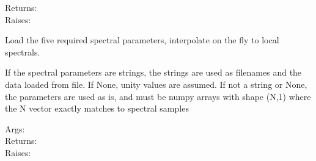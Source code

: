 \documentclass[a4paper,10pt,english]{sphinxmanual}
\begin{document}
\begin{fulllineitems}
\begin{fulllineitems}
\begin{description}
\item[{Returns:}] \leavevmode
{}

\item[{Raises:}] \leavevmode
{}

\end{description}

\end{fulllineitems}


\begin{fulllineitems}
\label{rylookup:pyradi.rylookup.RadLookup.LoadSpectrals}
Load the five required spectral parameters, interpolate on the 
fly to local spectrals.

If the spectral parameters are strings, the strings are used as filenames 
and the data loaded from file.  If None, unity values are assumed. If not 
a string or None, the parameters are used as is, and must be numpy arrays
with shape (N,1) where the N vector exactly matches to spectral samples
\begin{description}
\item[{Args:}] \leavevmode
{}

\item[{Returns:}] \leavevmode
{}

\item[{Raises:}] \leavevmode
{}

\end{description}


\end{fulllineitems}
\end{fulllineitems}
\end{document}

